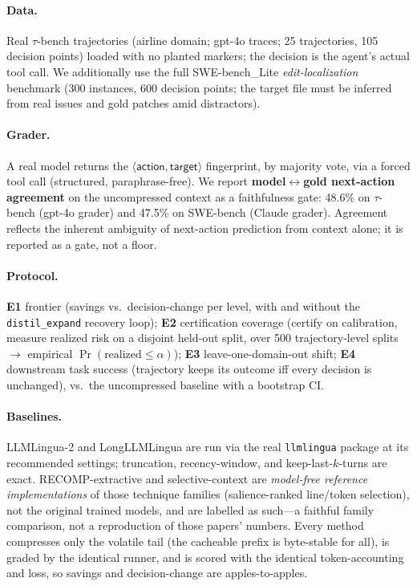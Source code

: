 \documentclass[11pt]{article}
\begin{document}
\paragraph{Data.} Real $\tau$-bench trajectories (airline domain; gpt-4o traces;
25 trajectories, 105 decision points) loaded with no planted markers; the decision
is the agent's actual tool call. We additionally use the full SWE-bench\_Lite
\emph{edit-localization} benchmark (300 instances, 600 decision points; the
target file must be inferred from real issues and gold patches amid distractors).
\paragraph{Grader.} A real model returns the
$\langle\textsf{action},\textsf{target}\rangle$ fingerprint, by majority vote, via a
forced tool call (structured, paraphrase-free). We report \textbf{model$\leftrightarrow$gold
next-action agreement} on the uncompressed context as a faithfulness gate: 48.6\%
on $\tau$-bench (gpt-4o grader) and 47.5\% on SWE-bench (Claude grader). Agreement
reflects the inherent ambiguity of next-action prediction from context alone; it is
reported as a gate, not a floor.
\paragraph{Protocol.} \textbf{E1} frontier (savings vs.\ decision-change per level,
with and without the \texttt{distil\_expand} recovery loop); \textbf{E2}
certification coverage (certify on calibration, measure realized risk on a disjoint
held-out split, over 500 trajectory-level splits $\to$ empirical
$\Pr(\text{realized}\le\alpha)$); \textbf{E3} leave-one-domain-out shift; \textbf{E4}
downstream task success (trajectory keeps its outcome iff every decision is
unchanged), vs.\ the uncompressed baseline with a bootstrap CI.

\paragraph{Baselines.} LLMLingua-2 and LongLLMLingua are run via the real
\texttt{llmlingua} package at its recommended settings; truncation, recency-window,
and keep-last-$k$-turns are exact. RECOMP-extractive and selective-context are
\emph{model-free reference implementations} of those technique families (salience-ranked
line/token selection), not the original trained models, and are labelled as such---a
faithful family comparison, not a reproduction of those papers' numbers. Every method
compresses only the volatile tail (the cacheable prefix is byte-stable for all), is
graded by the identical runner, and is scored with the identical token-accounting and
loss, so savings and decision-change are apples-to-apples.
\end{document}
